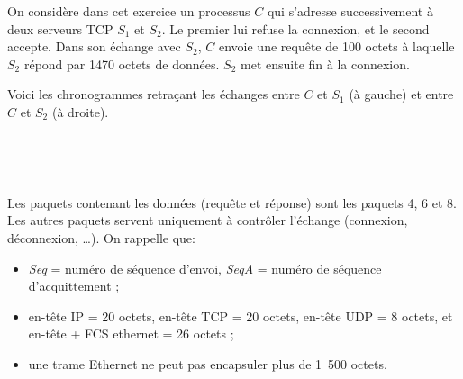 
On considère dans cet exercice un processus $C$ qui s'adresse
successivement à deux serveurs TCP $S_1$ et $S_2$. Le premier lui
refuse la connexion, et le second accepte. Dans son échange avec
$S_2$, $C$ envoie une requête de 100 octets à laquelle $S_2$ répond
par 1470 octets de données. $S_2$ met ensuite fin à la connexion.

Voici les chronogrammes retraçant les échanges entre $C$ et $S_1$ (à
gauche) et entre $C$ et $S_2$ (à droite).

\begin{minipage}[t]{.40\textwidth}
  \begin{center}~\\\end{center}
\end{minipage}
\hfill
\begin{minipage}[t]{.40\textwidth}
  \begin{center}~\\\end{center}
\end{minipage}

Les paquets contenant les données (requête et réponse) sont les
paquets 4, 6 et 8. Les autres paquets servent uniquement à contrôler
l'échange (connexion, déconnexion, \ldots).  On rappelle que:
\begin{itemize}
\item {\em Seq} = numéro de séquence d'envoi, {\em SeqA} = numéro de
  séquence d'acquittement ;
\item en-tête IP = 20 octets, en-tête TCP = 20 octets, en-tête UDP = 8
  octets, et en-tête + FCS ethernet = 26 octets ;
\item une trame Ethernet ne peut pas encapsuler plus de 1~500 octets.
\end{itemize}

